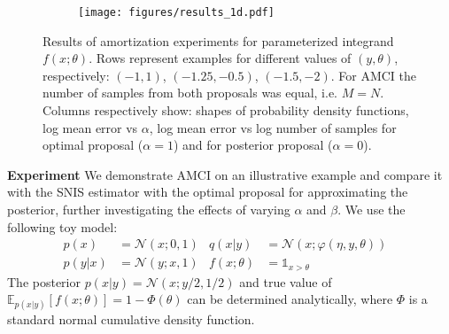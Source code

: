 \documentclass[12pt]{article}
\begin{document}
\begin{figure}[t]
  \centering
	\begin{subfigure}[b]{0.9\textwidth}
		\centering
		\texttt{[image: figures/results\_1d.pdf]}
		\captionsetup{justification=centering}
		
	\end{subfigure}
	\caption{
		Results of amortization experiments for parameterized integrand $f(x; \theta)$.
		Rows represent examples for different values of $(y, \theta)$, respectively: $(-1, 1)$, $(-1.25, -0.5)$, $(-1.5, -2)$.
		For AMCI the number of samples from both proposals was equal, i.e. $M=N$.
		Columns respectively show: shapes of probability density functions, log mean error vs $\alpha$, 
		log mean error vs log number of samples for optimal proposal ($\alpha = 1$) and for posterior proposal ($\alpha = 0$). \vspace{-12pt}
	}
	\label{fig:results_1d}
\end{figure}

 \textbf{Experiment} \quad We demonstrate AMCI on an illustrative example
 and compare it with the SNIS estimator
 with the optimal proposal for approximating the posterior, further
 investigating the effects of varying $\alpha$ and $\beta$.
We use the following toy model:
\begin{align*}
p(x) &= \mathcal{N}(x; 0, 1) &
q(x|y) &= \mathcal{N}\left(x; \varphi(\eta, y, \theta) \right) \\
p(y|x) &= \mathcal{N}(y; x, 1) &
f(x; \theta) &= \mathds{1}_{x>\theta} &
\end{align*} 
The posterior {$p(x|y) = \mathcal{N}(x; y/2, 1/2)$} and true value of
$\mathbb{E}_{p(x|y)} \left[ f(x; \theta) \right] = 1-\Phi(\theta)$ can be determined analytically, where $\Phi$ is a standard normal cumulative density function.
\end{document}
